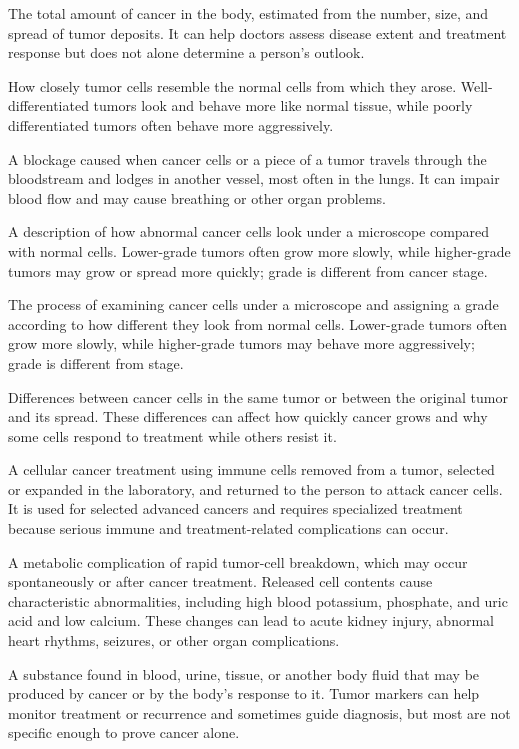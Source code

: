  The total amount of cancer in the body, estimated from the number, size, and spread of tumor deposits. It can help doctors assess disease extent and treatment response but does not alone determine a person’s outlook.

 How closely tumor cells resemble the normal cells from which they arose. Well-differentiated tumors look and behave more like normal tissue, while poorly differentiated tumors often behave more aggressively.

 A blockage caused when cancer cells or a piece of a tumor travels through the bloodstream and lodges in another vessel, most often in the lungs. It can impair blood flow and may cause breathing or other organ problems.

 A description of how abnormal cancer cells look under a microscope compared with normal cells. Lower-grade tumors often grow more slowly, while higher-grade tumors may grow or spread more quickly; grade is different from cancer stage.

 The process of examining cancer cells under a microscope and assigning a grade according to how different they look from normal cells. Lower-grade tumors often grow more slowly, while higher-grade tumors may behave more aggressively; grade is different from stage.

 Differences between cancer cells in the same tumor or between the original tumor and its spread. These differences can affect how quickly cancer grows and why some cells respond to treatment while others resist it.

 A cellular cancer treatment using immune cells removed from a tumor, selected or expanded in the laboratory, and returned to the person to attack cancer cells. It is used for selected advanced cancers and requires specialized treatment because serious immune and treatment-related complications can occur.

 A metabolic complication of rapid tumor-cell breakdown, which may occur spontaneously
or after cancer treatment. Released cell contents cause characteristic abnormalities, including high blood potassium,
phosphate, and uric acid and low calcium. These changes can lead to acute kidney injury, abnormal heart rhythms,
seizures, or other organ complications.

 A substance found in blood, urine, tissue, or another body fluid that may be produced by cancer or by the body’s response to it. Tumor markers can help monitor treatment or recurrence and sometimes guide diagnosis, but most are not specific enough to prove cancer alone.

